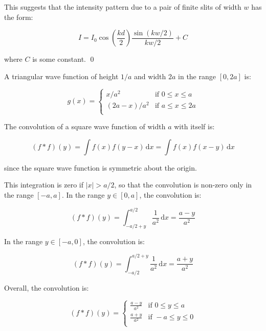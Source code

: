 \documentclass[12pt]{article}
\begin{document}
This suggests that the intensity pattern due to a pair of finite slits of width $w$ has the form:

\begin{equation}
    I = I_{0} \cos{\left( \frac{kd}{2} \right)} \frac{\sin{(kw/2)}}{kw/2} + C
\end{equation}

where $C$ is some constant.
\qed



A triangular wave function of height $1/a$ and width $2a$ in the range $[0, 2a]$ is:

\begin{equation}
    g(x) =
    \begin{cases}
        x/a^2        & \text{if } 0 \leq x \leq a  \\
        (2a - x)/a^2 & \text{if } a \leq x \leq 2a \\
    \end{cases}
\end{equation}

The convolution of a square wave function of width $a$ with itself is:

\begin{equation}
    (f * f)(y) = \int f(x) f(y - x) \, \mathrm{d}x = \int f(x) f(x - y) \, \mathrm{d}x
\end{equation}

since the square wave function is symmetric about the origin.

This integration is zero if $\left\lvert x \right\rvert > a/2$, so that the convolution is non-zero only in the range $[-a, a]$. In the range $y \in [0, a]$, the convolution is:

\begin{equation}
    (f * f)(y) = \int_{-a/2+y}^{a/2} \frac{1}{a^{2}} \, \mathrm{d}x = \frac{a - y}{a^{2}}
\end{equation}

In the range $y \in [-a, 0]$, the convolution is:

\begin{equation}
    (f * f)(y) = \int_{-a/2}^{a/2+y} \frac{1}{a^{2}} \, \mathrm{d}x = \frac{a + y}{a^{2}}
\end{equation}

Overall, the convolution is:

\begin{equation}
    (f * f)(y) =
    \begin{cases}
        \frac{a - y}{a^{2}} & \text{if } 0 \leq y \leq a  \\
        \frac{a + y}{a^{2}} & \text{if } -a \leq y \leq 0 \\
    \end{cases}
\end{equation}
\end{document}
